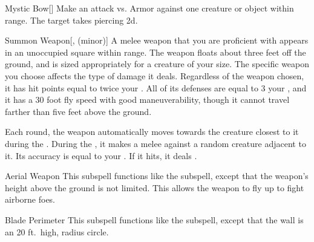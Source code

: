 \begin{ability}[\nth{1}]{Mystic Bow}[]
Make an attack vs. Armor against one creature or object within \rngmed range.
\hit The target takes piercing  \plus2d.
\end{ability}
\vspace{0.25em}



\begin{ability}[\nth{1}]{Summon Weapon}[,  (minor)]
A melee weapon that you are proficient with appears in an unoccupied square within \rngmed range.
The weapon floats about three feet off the ground, and is sized appropriately for a creature of your size.
The specific weapon you choose affects the type of damage it deals.
Regardless of the weapon chosen, it has hit points equal to twice your .
All of its defenses are equal to 3 \add your , and it has a 30 foot fly speed with good maneuverability, though it cannot travel farther than five feet above the ground.

Each round, the weapon automatically moves towards the creature closest to it during the .
During the , it makes a melee  against a random creature adjacent to it.
Its accuracy is equal to your .
If it hits, it deals .
\end{ability}
\vspace{0.25em}



\begin{ability}[\nth{2}]{Aerial Weapon}
This subspell functions like the  subspell, except that the weapon's height above the ground is not limited.
This allows the weapon to fly up to fight airborne foes.
\end{ability}
\vspace{0.25em}



\begin{ability}[\nth{2}]{Blade Perimeter}
This subspell functions like the  subspell, except that the wall is an 20 ft.\ high, \areamed radius circle.
\end{ability}
\vspace{0.25em}



